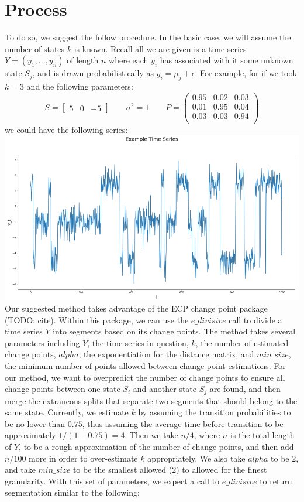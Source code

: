 \documentclass[a4paper]{amsproc}
\theoremstyle{plain}
\theoremstyle{definition}
\theoremstyle{remark}
\numberwithin{equation}{section}
\begin{document}
	\section{Process}
	To do so, we suggest the follow procedure. In the basic case, we will assume the number of states $k$ is known. Recall all we are given is a time series $Y = (y_1, ..., y_n)$ of length $n$ where each $y_i$ has associated with it some unknown state $S_j$, and is drawn probabilistically as $y_i = \mu_j + \epsilon$. For example, for if we took $k = 3$ and the following parameters:
	\[
	S = \begin{bmatrix} 5 & 0 & -5 \end{bmatrix}
	\qquad
	\sigma^2 = 1
	\qquad
	P = \begin{pmatrix} 
	0.95 & 0.02 & 0.03 \\
	0.01 & 0.95 & 0.04 \\
	0.03 & 0.03 & 0.94 \\
	\end{pmatrix}
	\]
	we could have the following series:\\
    \includegraphics[scale=0.4]{examplets.png}\\
    Our suggested method takes advantage of the ECP change point package (TODO: cite). Within this package, we can use the $e\_divisive$ call to divide a time series $Y$ into segments based on its change points. The method takes several parameters including $Y$, the time series in question, $k$, the number of estimated change points, $alpha$, the exponentiation for the distance matrix, and $min\_size$, the minimum number of points allowed between change point estimations. For our method, we want to overpredict the number of change points to ensure all change points between one state $S_i$ and another state $S_j$ are found, and then merge the extraneous splits that separate two segments that should belong to the same state. Currently, we estimate $k$ by assuming the transition probabilities to be no lower than $0.75$, thus assuming the average time before transition to be approximately $1/(1 - 0.75) = 4$. Then we take $n/4$, where $n$ is the total length of $Y$, to be a rough approximation of the number of change points, and then add $n/100$ more in order to over-estimate $k$ appropriately. We also take $alpha$ to be $2$, and take $min\_size$ to be the smallest allowed ($2$) to allowed for the finest granularity. With this set of parameters, we expect a call to $e\_divisive$ to return segmentation similar to the following:\\
\end{document}

